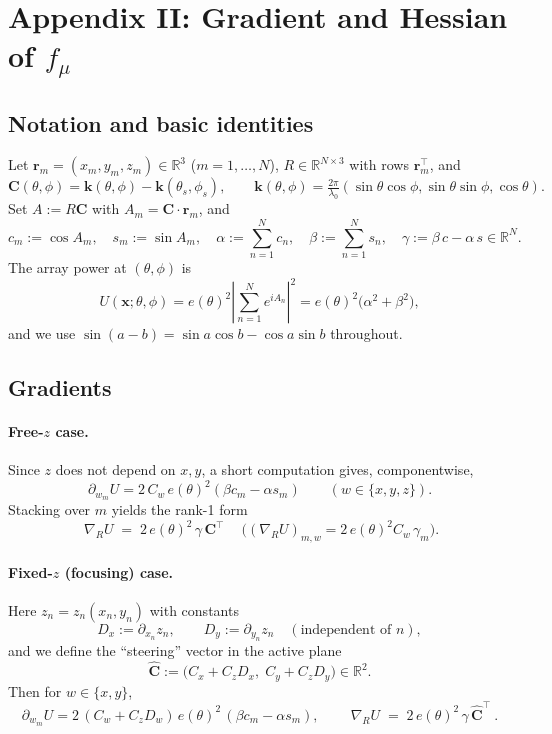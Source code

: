 \documentclass[11pt,letterpaper]{article}
\theoremstyle{definition}
\theoremstyle{plain}
\begin{document}
\section{Appendix II: Gradient and Hessian of $f_\mu$}


\subsection*{Notation and basic identities}
Let $\mathbf r_m=(x_m,y_m,z_m)\in\mathbb R^3$ ($m=1,\dots,N$), $R\in\mathbb R^{N\times 3}$ with rows $\mathbf r_m^\top$, and
\[
\mathbf C(\theta,\phi)
=\mathbf k(\theta,\phi)-\mathbf k(\theta_s,\phi_s),\qquad
\mathbf k(\theta,\phi)=\tfrac{2\pi}{\lambda_0}(\sin\theta\cos\phi,\sin\theta\sin\phi,\cos\theta).
\]
Set $A:=R\mathbf C$ with $A_m=\mathbf C\!\cdot\!\mathbf r_m$, and
\[
c_m:=\cos A_m,\quad s_m:=\sin A_m,\quad
\alpha:=\sum_{n=1}^N c_n,\quad \beta:=\sum_{n=1}^N s_n,\quad
\gamma:=\beta\,c-\alpha\,s\in\mathbb R^N.
\]
The array power at $(\theta,\phi)$ is
\[
U(\mathbf x; \theta,\phi)
= e(\theta)^2 \left|\sum_{n=1}^N e^{iA_n}\right|^2
= e(\theta)^2\big(\alpha^2+\beta^2\big),
\]
and we use $\sin(a-b)=\sin a\cos b-\cos a\sin b$ throughout.

\subsection*{Gradients}

\paragraph{Free-$z$ case.}
Since $z$ does not depend on $x,y$, a short computation gives, componentwise,
\[
\partial_{w_m}U = 2\,C_w\,e(\theta)^2(\beta c_m-\alpha s_m)
\qquad (w\in\{x,y,z\}).
\]
Stacking over $m$ yields the rank-1 form
\[
\boxed{\ \nabla_R U \;=\; 2\,e(\theta)^2\,\gamma\,\mathbf C^\top\ } \quad
\big((\nabla_R U)_{m,w}=2\,e(\theta)^2 C_w\,\gamma_m\big).
\]

\paragraph{Fixed-$z$ (focusing) case.}
Here $z_n=z_n(x_n,y_n)$ with constants
\[
D_x:=\partial_{x_n}z_n,\qquad D_y:=\partial_{y_n}z_n
\quad(\text{independent of }n),
\]
and we define the “steering” vector in the active plane
\[
\widehat{\mathbf C}:=\big(C_x+C_z D_x,\; C_y+C_z D_y\big)\in\mathbb R^2.
\]
Then for $w\in\{x,y\}$,
\[
\partial_{w_m}U
=2\,(C_w+C_z D_w)\,e(\theta)^2\,(\beta c_m-\alpha s_m),
\qquad
\boxed{\ \nabla_R U \;=\; 2\,e(\theta)^2\,\gamma\,\widehat{\mathbf C}^{\!\top}\ } .
\]
\end{document}
